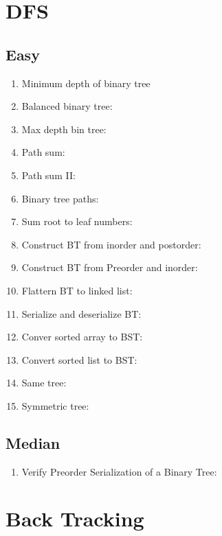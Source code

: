 \documentclass[DIV=calc, paper=a4, fontsize=11pt, twocolumn]{scrartcl}	 %
\begin{document}

\section*{DFS}

\subsection*{Easy}
\begin{enumerate}
\item Minimum depth of binary tree \cite{111}
\item Balanced binary tree: \cite{110} 
\item Max depth bin tree: \cite{104}
\item Path sum: \cite{112}
\item Path sum II: \cite{113}
\item Binary tree paths: \cite{257}
\item Sum root to leaf numbers: \cite{129}
\item Construct BT from inorder and postorder: \cite{106}
\item Construct BT from Preorder and inorder: \cite{105}
\item Flattern BT to linked list: \cite{114} 
\item Serialize and deserialize BT: \cite{297}
\item Conver sorted array to BST: \cite{108}
\item Convert sorted list to BST: \cite{109}
\item Same tree:\cite{100}
\item Symmetric tree: \cite{101}
\end{enumerate}

\subsection*{Median}
\begin{enumerate}
\item {\color{red} Verify Preorder Serialization of a Binary Tree:} \cite{255}
\end{enumerate}


\section*{Back Tracking}
\end{document}
